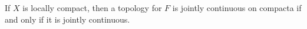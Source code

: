 If $X$ is locally compact, then a topology for $F$ is jointly continuous on compacta if and only if it is jointly continuous.
